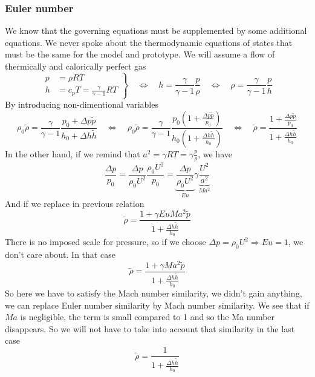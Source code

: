 		\subsubsection{Euler number}
			We know that the governing equations must be supplemented by some additional equations. We never spoke about the thermodynamic equations of states that must be the same for the model and prototype. We will assume a flow of thermically and calorically perfect gas 
			\begin{equation}
				\left.
				\begin{aligned}
				p &= \rho RT\\
				h &= c_p T = \frac{\gamma}{\gamma - 1} RT
				\end{aligned}
				\right\} \quad
				\Leftrightarrow \quad
				h = \frac{\gamma}{\gamma - 1} \frac{p}{\rho} \quad \Leftrightarrow \quad
				\rho = \frac{\gamma}{\gamma -1} \frac{p}{h}
				\label{eq:2.32}
			\end{equation}
			By introducing non-dimentional variables 
			\begin{equation}
				\rho _0 \tilde{\rho} = \frac{\gamma}{\gamma -1} \frac{p_0 + \Delta p \tilde{p}}{h_0 + \Delta h \tilde{h}} \quad \Leftrightarrow \quad \rho _0 \tilde{\rho} = \frac{\gamma}{\gamma - 1} \frac{p_0\left( 1 + \frac{\Delta p \tilde{p}}{p_0} \right)}{h_0 \left( 1 + \frac{\Delta h \tilde{h}}{h_0} \right)} \quad \Leftrightarrow \quad \tilde{\rho} = \frac{1+\frac{\Delta p \tilde{p}}{p_0}}{1+\frac{\Delta h\tilde{h}}{h_0}}
			\end{equation}
			In the other hand, if we remind that $a^2 = \gamma RT = \gamma \frac{p}{\rho}$, we have
			\begin{equation}
				\frac{\Delta p }{p_0} = \frac{\Delta p}{\rho _0 U^2}\frac{\rho _0 U^2}{p_0} = \underbrace{\frac{\Delta p}{\rho _0 U^2}}_{Eu}\gamma \underbrace{\frac{U^2}{a^2}}_{Ma^2}
			\end{equation}
			And if we replace in previous relation 
			\begin{equation}
				\tilde{\rho} = \frac{1+\gamma Eu Ma^2\tilde{p}}{1+\frac{\Delta h\tilde{h}}{h_0}}
			\end{equation}
			There is no imposed scale for pressure, so if we choose $\Delta p = \rho _0 U^2\Rightarrow Eu = 1$, we don't care about. In that case
			\begin{equation}
				\tilde{\rho} = \frac{1+\gamma Ma^2\tilde{p}}{1+\frac{\Delta h\tilde{h}}{h_0}}
			\end{equation}
			So here we have to satisfy the Mach number similarity, we didn't gain anything, we can replace Euler number similarity by Mach number similarity. We see that if $Ma$ is negligible, the term is small compared to 1 and so the Ma number disappears. So we will not have to take into account that similarity in the last case
			\begin{equation}
				\tilde{\rho} = \frac{1}{1+\frac{\Delta h\tilde{h}}{h_0}}
				\label{eq:2.37}
\end{equation}			 
			
